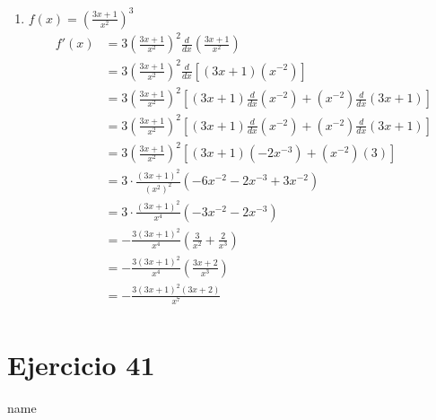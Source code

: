 \documentclass[12pt]{article}
\begin{document}
\begin{enumerate}[label=(\alph*)]
\item $f(x)=\left( \frac{3x+1}{x^2} \right)^3$
  \begin{equation*}
    \begin{split}
      f'(x)
      &= 3\left( \frac{3x+1}{x^2} \right)^2 \frac{d}{dx}\left( \frac{3x+1}{x^2} \right)\\
      &= 3\left( \frac{3x+1}{x^2} \right)^2 \frac{d}{dx}\left[(3x+1)(x^{-2})\right]\\
      &= 3\left( \frac{3x+1}{x^2} \right)^2 \left[
      (3x+1)\frac{d}{dx}(x^{-2})+(x^{-2})\frac{d}{dx}(3x+1) \right]\\
      &= 3\left( \frac{3x+1}{x^2} \right)^2 \left[
      (3x+1)\frac{d}{dx}(x^{-2})+(x^{-2})\frac{d}{dx}(3x+1) \right]\\
      &= 3\left( \frac{3x+1}{x^2} \right)^2 \left[ (3x+1)(-2x^{-3})+(x^{-2})(3) \right]\\
      &= 3\cdot \frac{(3x+1)^2}{(x^2)^2} \left( -6x^{-2}-2x^{-3}+3x^{-2} \right)\\
      &= 3 \cdot \frac{(3x+1)^2}{x^4} \left( -3x^{-2}-2x^{-3} \right)\\
      &= -\frac{3(3x+1)^2}{x^4} \left( \frac{3}{x^2}+\frac{2}{x^3} \right)\\
      &= -\frac{3(3x+1)^2}{x^4} \left( \frac{3x+2}{x^3} \right)\\
      &= -\frac{3(3x+1)^2(3x+2)}{x^7} \\
    \end{split}
  \end{equation*}
  
\end{enumerate}

\section{Ejercicio 41} name \\
\end{document}
